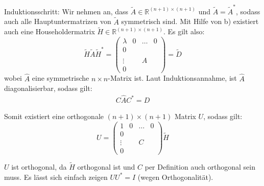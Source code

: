 \documentclass[11pt]{article}
\theoremstyle{plain}
\theoremstyle{definition}
\renewcommand{\a}{\"{a}}
\begin{document}
\begin{itemize}
Induktionsschritt: Wir nehmen an, dass $\tilde{A}\in \mathbb{R}^{(n+1)\times(n+1)}$ und $\tilde{A}=\tilde{A}^*$, sodass auch alle Hauptuntermatrizen von $\tilde{A}$ symmetrisch sind. Mit Hilfe von b) existiert auch eine Householdermatrix $\tilde{H} \in \mathbb{R}^{(n+1)\times(n+1)}$.
Es gilt also:
\begin{equation}
\tilde{H}\tilde{A}\tilde{H}^* = 
\left(
\begin{array}{c|ccc}
\lambda & 0 & \hdots & 0    \\\hline
0  & & &                    \\
\vdots & & \hat{A} &        \\
0  & & &
\end{array}
\right)
= \tilde{D}
\end{equation}
wobei $\hat{A}$ eine symmetrische $n \times n$-Matrix ist. Laut Induktionsannahme, ist $\hat{A}$ diagonalisierbar, sodass gilt:
\begin{align}
C\hat{A}C^*=D 
\end{align}


Somit existiert eine orthogonale $(n+1)\times(n+1)$ Matrix $U$, sodass gilt:
\begin{equation}
U = 
\left(
\begin{array}{c|ccc}
1 & 0 & \hdots & 0    \\\hline
0  & & &                    \\
\vdots & & C &        \\
0  & & &
\end{array}
\right)
\tilde{H}
\end{equation}

$U$ ist orthogonal, da $\tilde{H}$ orthogonal ist und $C$ per Definition auch orthogonal sein muss. Es l\a sst sich einfach zeigen $UU^*=I$ (wegen Orthogonalit\a t).


\end{itemize}
\end{document}
